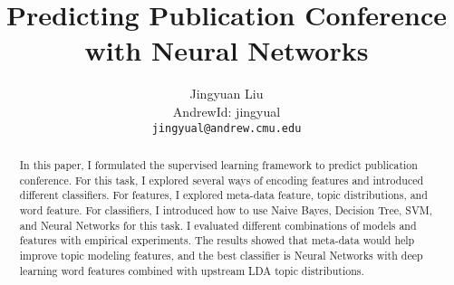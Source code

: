 \documentclass{article} %
\title{Predicting Publication Conference with Neural Networks}
\author{
Jingyuan Liu\\
AndrewId: jingyual\\
\texttt{jingyual@andrew.cmu.edu} \\
}
\begin{document}
\maketitle



\begin{abstract}
In this paper, I formulated the supervised learning framework to predict
publication conference. For this task, I explored several ways of encoding
features and introduced different classifiers. For features, I explored
meta-data feature, topic distributions, and word feature. For classifiers,
I introduced how to use Naive Bayes, Decision Tree, SVM, and Neural Networks
for this task. I evaluated different combinations of models and features with
empirical experiments. The results showed that meta-data would help improve
topic modeling features, and the best classifier is Neural Networks with
deep learning word features combined with upstream LDA topic distributions.
\end{abstract}


















{}

\end{document}
